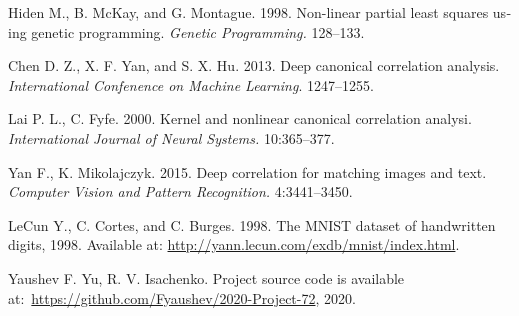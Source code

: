 \documentclass[12pt]{article}
\begin{document}
\begin{otherlanguage}{english}
\begin{thebibliography}{99}
Hiden M., B. McKay, and G. Montague. 1998. Non-linear partial least squares using genetic programming. \textit{Genetic Programming.} 128--133.

Chen D. Z., X. F. Yan, and S. X. Hu. 2013. Deep canonical correlation analysis. \textit{International Confenence on Machine Learning}. 1247--1255.

Lai P. L., C. Fyfe. 2000. Kernel and nonlinear canonical correlation analysi. \textit{International Journal of Neural Systems.} 10:365--377.

Yan F., K. Mikolajczyk. 2015. Deep correlation for matching images and text. \textit{Computer Vision and Pattern Recognition.} 4:3441--3450.

LeCun Y., C. Cortes, and C. Burges. 1998. The MNIST dataset of handwritten digits, 1998. Available at: \url{http://yann.lecun.com/exdb/mnist/index.html}.

Yaushev F. Yu, R. V. Isachenko. Project source code is available at:~\url{https://github.com/Fyaushev/2020-Project-72}, 2020.
		
\end{thebibliography}
\end{otherlanguage}
\end{document}
